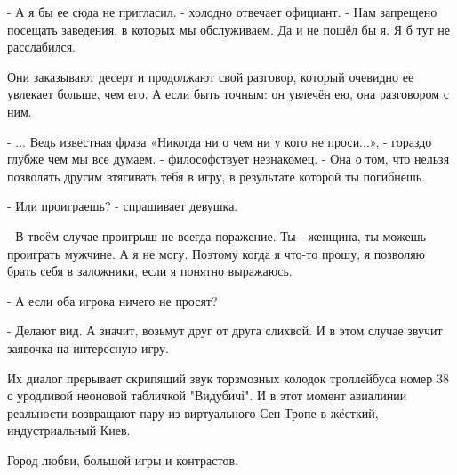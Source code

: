 - А я бы ее сюда не пригласил. - холодно отвечает официант. - Нам запрещено
посещать заведения, в которых мы обслуживаем. Да и не пошёл бы я. Я б тут не
расслабился. 

Они заказывают десерт и продолжают свой разговор, который очевидно ее увлекает
больше, чем его. А если быть точным: он увлечён ею, она разговором с ним. 

- ... Ведь известная фраза «Никогда ни о чем ни у кого не проси...», - гораздо
глубже чем мы все думаем. - философствует незнакомец. - Она о том, что нельзя
позволять другим втягивать тебя в игру, в результате которой ты погибнешь. 

- Или проиграешь? - спрашивает девушка.

- В твоём случае проигрыш не всегда поражение. Ты - женщина, ты можешь
проиграть мужчине. А я не могу. Поэтому когда я что-то прошу, я позволяю брать
себя в заложники, если я понятно выражаюсь.

- А если оба игрока ничего не просят?

- Делают вид. А значит, возьмут друг от друга слихвой. И в этом случае звучит
заявочка на интересную игру. 

Их диалог прерывает скрипящий звук торзмозных колодок троллейбуса номер 38 с
уродливой неоновой табличкой "Видубичі". И в этот момент авиалинии реальности
возвращают пару из виртуального Сен-Тропе в жёсткий, индустриальный Киев.

Город любви, большой игры и контрастов.

